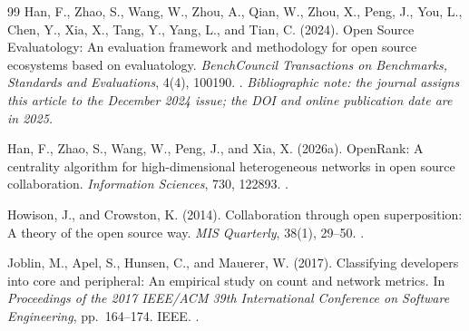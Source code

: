 \begin{thebibliography}{99}
Han, F., Zhao, S., Wang, W., Zhou, A., Qian, W., Zhou, X., Peng, J., You, L., Chen, Y., Xia, X., Tang, Y., Yang, L., and Tian, C. (2024).
Open Source Evaluatology: An evaluation framework and methodology for open source ecosystems based on evaluatology.
\emph{BenchCouncil Transactions on Benchmarks, Standards and Evaluations}, 4(4), 100190.
.
\emph{Bibliographic note: the journal assigns this article to the December 2024 issue; the DOI and online publication date are in 2025.}

Han, F., Zhao, S., Wang, W., Peng, J., and Xia, X. (2026a).
OpenRank: A centrality algorithm for high-dimensional heterogeneous networks in open source collaboration.
\emph{Information Sciences}, 730, 122893.
.

Howison, J., and Crowston, K. (2014).
Collaboration through open superposition: A theory of the open source way.
\emph{MIS Quarterly}, 38(1), 29--50.
.

Joblin, M., Apel, S., Hunsen, C., and Mauerer, W. (2017).
Classifying developers into core and peripheral: An empirical study on count and network metrics.
In \emph{Proceedings of the 2017 IEEE/ACM 39th International Conference on Software Engineering}, pp.~164--174. IEEE.
.

\end{thebibliography}
\clearpage
\begingroup
\renewcommand{\bibsection}{\section*{References\enspace{\normalfont\sffamily\fontsize{11}{14}\selectfont continued}}}
